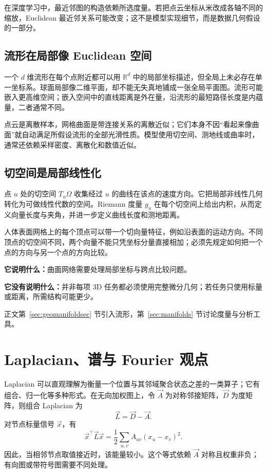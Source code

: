 在深度学习中，最近邻图的构造依赖所选度量。若把点云坐标从米改成各轴不同的缩放，Euclidean 最近邻关系可能改变；这不是模型实现细节，而是数据几何假设的一部分。

\subsection{流形在局部像 Euclidean 空间}

一个 $d$ 维流形在每个点附近都可以用 $\mathbb{R}^d$ 中的局部坐标描述，但全局上未必存在单一坐标系。球面局部像二维平面，却不能无失真地铺成一张全局平面图。流形可能嵌入更高维空间；嵌入空间中的直线距离是外在量，沿流形的最短路径长度是内蕴量，二者通常不同。

点云是离散样本，网格曲面是带连接关系的离散近似；它们本身不因“看起来像曲面”就自动满足所假设流形的全部光滑性质。模型使用切空间、测地线或曲率时，通常还依赖采样密度、离散化和数值近似。

\subsection{切空间是局部线性化}

点 $u$ 处的切空间 $T_u\Omega$ 收集经过 $u$ 的曲线在该点的速度方向。它把局部非线性几何转化为可做线性代数的空间。Riemann 度量 $g_u$ 在每个切空间上给出内积，从而定义向量长度与夹角，并进一步定义曲线长度和测地距离。

\begin{tcolorbox}[width=\linewidth,colback=boxgray!35,colframe=darkgry,title=深度学习实例：曲面上的方向特征]
人体表面网格上的每个顶点可以带一个切向量特征，例如沿表面的运动方向。不同顶点的切空间不同，两个向量不能只凭坐标分量直接相加；必须先规定如何把一个点的方向与另一个点的方向比较。

\textbf{它说明什么：}曲面网络需要处理局部坐标与跨点比较问题。

\textbf{它没有说明什么：}并非每项 3D 任务都必须使用完整微分几何；若任务只使用标量或距离，所需结构可能更少。
\end{tcolorbox}

正文第~\ref{sec:geomanifoldsec} 节引入流形，第~\ref{sec:manifolds} 节讨论度量与分析工具。

\section{Laplacian、谱与 Fourier 观点}
\label{app:primer:laplacian}

Laplacian 可以直观理解为衡量一个位置与其邻域聚合状态之差的一类算子；它有组合、归一化等多种形式。在无向加权图上，令 $\vec{A}$ 为对称邻接矩阵，$\vec{D}$ 为度矩阵，则组合 Laplacian 为
\begin{equation}
\vec{L}=\vec{D}-\vec{A}.
\label{app:primer:graph-laplacian}
\end{equation}
对节点标量信号 $\vec{x}$，有
\begin{equation}
\vec{x}^{\top}\vec{L}\vec{x}
=\frac{1}{2}\sum_{u,v}A_{uv}(x_u-x_v)^2.
\label{app:primer:dirichlet-energy}
\end{equation}
因此，当相邻节点取值接近时，该能量较小。这个等式依赖 $\vec{A}$ 对称且权重非负；有向图或带符号图需要不同处理。

